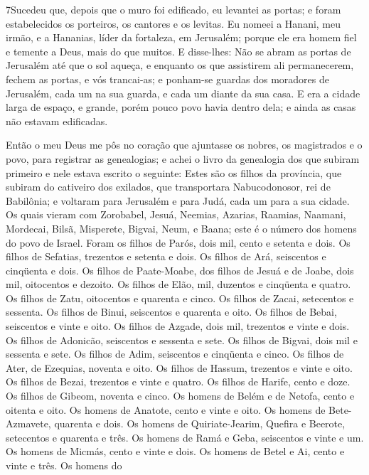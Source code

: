 \medskip

\lettrine{7} Sucedeu que, depois que o muro foi edificado, eu
levantei as portas; e foram estabelecidos os porteiros, os cantores
e os levitas. Eu nomeei a Hanani, meu irmão, e a Hananias, líder
da fortaleza, em Jerusalém; porque ele era homem fiel e temente a
Deus, mais do que muitos. E disse-lhes: Não se abram as portas
de Jerusalém até que o sol aqueça, e enquanto os que assistirem ali
permanecerem, fechem as portas, e vós trancai-as; e ponham-se
guardas dos moradores de Jerusalém, cada um na sua guarda, e cada um
diante da sua casa. E era a cidade larga de espaço, e grande,
porém pouco povo havia dentro dela; e ainda as casas não estavam
edificadas.

Então o meu Deus me pôs no coração que ajuntasse os nobres, os
magistrados e o povo, para registrar as genealogias; e achei o livro
da genealogia dos que subiram primeiro e nele estava escrito o
seguinte: Estes são os filhos da província, que subiram do
cativeiro dos exilados, que transportara Nabucodonosor, rei de
Babilônia; e voltaram para Jerusalém e para Judá, cada um para a sua
cidade. Os quais vieram com Zorobabel, Jesuá, Neemias, Azarias,
Raamias, Naamani, Mordecai, Bilsã, Misperete, Bigvai, Neum, e Baana;
este é o número dos homens do povo de Israel. Foram os filhos de
Parós, dois mil, cento e setenta e dois. Os filhos de Sefatias,
trezentos e setenta e dois. Os filhos de Ará, seiscentos e
cinqüenta e dois. Os filhos de Paate-Moabe, dos filhos de
Jesuá e de Joabe, dois mil, oitocentos e dezoito. Os filhos
de Elão, mil, duzentos e cinqüenta e quatro. Os filhos de
Zatu, oitocentos e quarenta e cinco. Os filhos de Zacai,
setecentos e sessenta. Os filhos de Binui, seiscentos e
quarenta e oito. Os filhos de Bebai, seiscentos e vinte e
oito. Os filhos de Azgade, dois mil, trezentos e vinte e
dois. Os filhos de Adonicão, seiscentos e sessenta e sete.
Os filhos de Bigvai, dois mil e sessenta e sete. Os
filhos de Adim, seiscentos e cinqüenta e cinco. Os filhos de
Ater, de Ezequias, noventa e oito. Os filhos de Hassum,
trezentos e vinte e oito. Os filhos de Bezai, trezentos e
vinte e quatro. Os filhos de Harife, cento e doze. Os
filhos de Gibeom, noventa e cinco. Os homens de Belém e de
Netofa, cento e oitenta e oito. Os homens de Anatote, cento e
vinte e oito. Os homens de Bete-Azmavete, quarenta e dois.
Os homens de Quiriate-Jearim, Quefira e Beerote, setecentos e
quarenta e três. Os homens de Ramá e Geba, seiscentos e vinte
e um. Os homens de Micmás, cento e vinte e dois. Os
homens de Betel e Ai, cento e vinte e três. Os homens do
